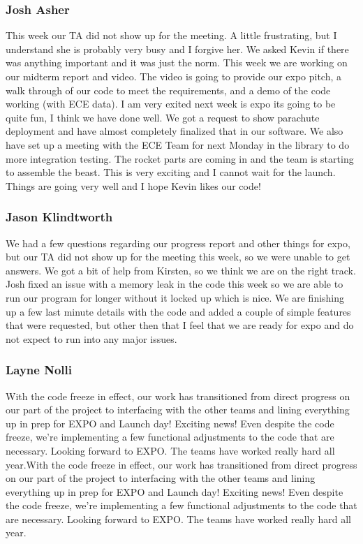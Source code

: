 \documentclass[10pt,draftclsnofoot,onecolumn]{IEEEtran}
\begin{document}
\subsubsection{Josh Asher}
This week our TA did not show up for the meeting. A little frustrating, but I understand she is probably very busy and I forgive her. We asked Kevin if there was anything important and it was just the norm. This week we are working on our midterm report and video. The video is going to provide our expo pitch, a walk through of our code to meet the requirements, and a demo of the code working (with ECE data). I am very exited next week is expo its going to be quite fun, I think we have done well. We got a request to show parachute deployment and have almost completely finalized that in our software. We also have set up a meeting with the ECE Team for next Monday in the library to do more integration testing. The rocket parts are coming in and the team is starting to assemble the beast. This is very exciting and I cannot wait for the launch. Things are going very well and I hope Kevin likes our code! \par

\subsubsection{Jason Klindtworth}
We had a few questions regarding our progress report and other things for expo, but our TA did not show up for the meeting this week, so we were unable to get answers. We got a bit of help from Kirsten, so we think we are on the right track. Josh fixed an issue with a memory leak in the code this week so we are able to run our program for longer without it locked up which is nice. We are finishing up a few last minute details with the code and added a couple of simple features that were requested, but other then that I feel that we are ready for expo and do not expect to run into any major issues. \par

\subsubsection{Layne Nolli}
With the code freeze in effect, our work has transitioned from direct progress on our part of the project to interfacing with the other teams and lining everything up in prep for EXPO and Launch day! Exciting news! Even despite the code freeze, we're implementing a few functional adjustments to the code that are necessary. Looking forward to EXPO. The teams have worked really hard all year.With the code freeze in effect, our work has transitioned from direct progress on our part of the project to interfacing with the other teams and lining everything up in prep for EXPO and Launch day! Exciting news! Even despite the code freeze, we're implementing a few functional adjustments to the code that are necessary. Looking forward to EXPO. The teams have worked really hard all year. \par
\end{document}
